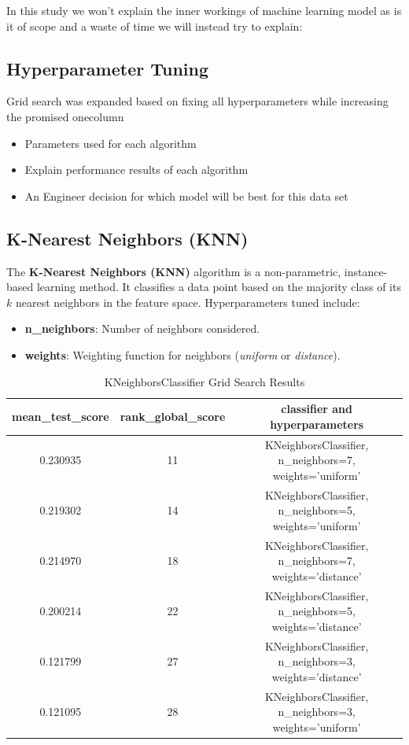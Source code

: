\documentclass{article}
\begin{document}
In this study we won't explain the inner workings of machine learning model
as is it of scope and a waste of time we will instead try to explain:

\subsection{Hyperparameter Tuning}
Grid search was expanded based on fixing all hyperparameters 
while increasing the promised onecolumn

\begin{itemize}
    \item Parameters used for each algorithm
    \item Explain performance results of each algorithm 
    \item An Engineer decision for which model will be best for this data set 
\end{itemize}

\subsection{K-Nearest Neighbors (KNN)}
The \textbf{K-Nearest Neighbors (KNN)} algorithm is a non-parametric, instance-based learning method. It classifies a data point based on the majority class of its $k$ nearest neighbors in the feature space. Hyperparameters tuned include:
\begin{itemize}
    \item \textbf{n\_neighbors}: Number of neighbors considered.
    \item \textbf{weights}: Weighting function for neighbors (\textit{uniform} or \textit{distance}).
\end{itemize}

\begin{table}[H]
    \centering
    \caption{KNeighborsClassifier Grid Search Results}
    \label{tab:table}
    \begin{tabular}{ccc}
    \toprule
    \textbf{mean\_test\_score} & \textbf{rank\_global\_score} & \textbf{classifier and hyperparameters} \\
    \midrule
    0.230935 & 11 & KNeighborsClassifier, n\_neighbors=7, weights='uniform' \\
    0.219302 & 14 & KNeighborsClassifier, n\_neighbors=5, weights='uniform' \\
    0.214970 & 18 & KNeighborsClassifier, n\_neighbors=7, weights='distance' \\
    0.200214 & 22 & KNeighborsClassifier, n\_neighbors=5, weights='distance' \\
    0.121799 & 27 & KNeighborsClassifier, n\_neighbors=3, weights='distance' \\
    0.121095 & 28 & KNeighborsClassifier, n\_neighbors=3, weights='uniform' \\
    \bottomrule
    \end{tabular}
\end{table}
\end{document}
